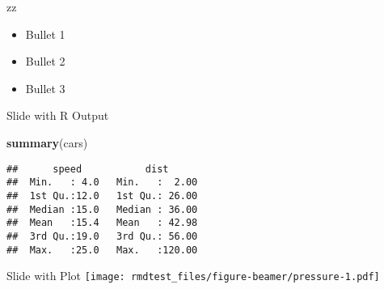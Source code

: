 \documentclass[
  ignorenonframetext,
]{beamer}
\newenvironment{Shaded}{\begin{snugshade}}{\end{snugshade}}
\newcommand{\FunctionTok}[1]{\textcolor[rgb]{0.13,0.29,0.53}{\textbf{#1}}}
\newcommand{\NormalTok}[1]{#1}
\providecommand{\tightlist}{%
  \setlength{\itemsep}{0pt}\setlength{\parskip}{0pt}}
\begin{document}
\begin{frame}{zz}
\protect\hypertarget{zz}{}
\begin{itemize}
\tightlist
\item
  Bullet 1
\item
  Bullet 2
\item
  Bullet 3
\end{itemize}
\end{frame}

\begin{frame}[fragile]{Slide with R Output}
\protect\hypertarget{slide-with-r-output}{}
\begin{Shaded}
\begin{Highlighting}[]
\FunctionTok{summary}\NormalTok{(cars)}
\end{Highlighting}
\end{Shaded}

\begin{verbatim}
##      speed           dist       
##  Min.   : 4.0   Min.   :  2.00  
##  1st Qu.:12.0   1st Qu.: 26.00  
##  Median :15.0   Median : 36.00  
##  Mean   :15.4   Mean   : 42.98  
##  3rd Qu.:19.0   3rd Qu.: 56.00  
##  Max.   :25.0   Max.   :120.00
\end{verbatim}
\end{frame}

\begin{frame}{Slide with Plot}
\protect\hypertarget{slide-with-plot}{}
\texttt{[image: rmdtest\_files/figure-beamer/pressure-1.pdf]}
\end{frame}
\end{document}
